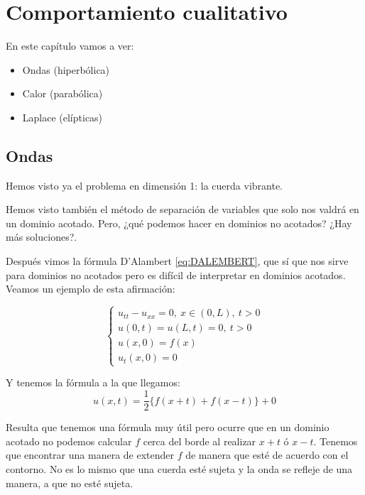 \chapter{Comportamiento cualitativo}


En este capítulo vamos a ver:

\begin{itemize}

	\item Ondas (hiperbólica)
	\item Calor (parabólica)
	\item Laplace (elípticas)

\end{itemize}


\section{Ondas}

	Hemos visto ya el problema en dimensión 1: la cuerda vibrante.

	Hemos visto también el método de separación de variables que solo nos valdrá en un dominio acotado. Pero, ¿qué podemos hacer en dominios no acotados? ¿Hay más soluciones?.

	Después vimos la fórmula D'Alambert \eqref{eq:DALEMBERT}, que sí que nos sirve para dominios no acotados pero es difícil de interpretar en dominios acotados. Veamos un ejemplo de esta afirmación:

	\begin{example}

		\[\begin{cases}
			u_{tt} - u_{xx} = 0, \ x \in (0,L), \ t > 0 \\
			u(0,t) = u(L,t) = 0, \ t > 0\\
			u(x,0) = f(x) \\
			u_t(x,0) = 0
		\end{cases}\]

		Y tenemos la fórmula a la que llegamos:
		\[ u(x,t) = \frac{1}{2} \{f(x+t)+f(x-t)\} + 0  \]

		Resulta que tenemos una fórmula muy útil pero ocurre que en un dominio acotado no podemos calcular $f$ cerca del borde al realizar $x+t$ ó $x-t$. Tenemos que encontrar una manera de extender $f$ de manera que esté de acuerdo con el contorno. No es lo mismo que una cuerda esté sujeta y la onda se refleje de una manera, a que no esté sujeta.

		\begin{center}
		\end{center}

	\end{example}

